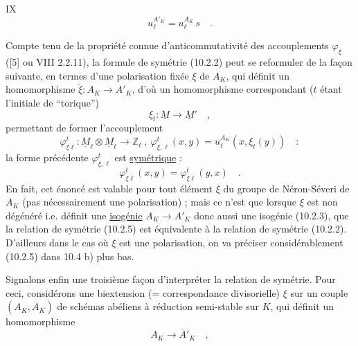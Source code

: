 \hfill IX
\[
 u_\ell^{A'_K}=u_\ell^{A_K}\,s\quad.\tag*{(10.2.2)}
\]

Compte tenu de la propriété connue d'anticommutativité des accouplements $\varphi_\xi$ ([5] ou VIII 2.2.11), la formule de symétrie (10.2.2) peut se reformuler de la façon suivante, en termes d'une polarisation fixée $\xi$ de $A_K$, qui définit un homomorphisme $\widetilde\xi:A_K\longrightarrow A'_K$, d'où un homomorphisme correspondant ($t$ étant l'initiale de ``torique'')
\[
 \xi_t:\underline M\longrightarrow\underline M'\quad,\tag*{(10.2.3)}
\]
permettant de former l'accouplement
\[
 \varphi^t_{\xi\ell}:\underline M_\ell\otimes\underline M_\ell\longrightarrow\mathbb Z_\ell
 \ ,\ \varphi^t_{\xi,\ell}(x,y)=u_\ell^{A_K}(x,\xi_t(y))\quad:\tag*{(10.2.4)}
\]
la forme précédente $\varphi^t_{\xi,\ell}$ est \uline{symétrique} :
\[
 \varphi^t_{\xi\ell}(x,y)=\varphi^t_{\xi\ell}(y,x)\quad.\tag*{(10.2.5)}
\]
En fait, cet énoncé est valable pour tout élément $\xi$ du groupe de Néron-Séveri de $A_K$ (pas nécessairement une polarisation) ; mais ce n'est que lorsque $\xi$ est non dégénéré i.e. définit une \uline{isogénie} $A_K\to A'_K$ donc aussi une isogénie (10.2.3), que la relation de symétrie (10.2.5) est équivalente à la relation de symétrie (10.2.2). D'ailleurs dans le cas où $\xi$ est une polarisation, on va préciser considérablement (10.2.5) dans 10.4 b) plus bas.

Signalons enfin une troisième façon d'interpréter la relation de symétrie. Pour ceci, considérons une biextension (= correspondance divisorielle) $\xi$ sur un couple $(A_K,\overline A_K)$ de schémas abéliens à réduction semi-stable sur $K$, qui définit un homomorphisme
\[
 A_K\longrightarrow\overline A'_K\quad,
\]
